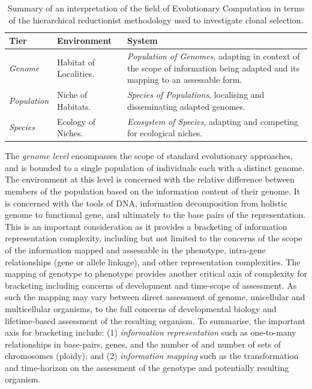 \begin{table}[htp]
	\centering\small
		\begin{tabularx}{\textwidth}{llX}
		\toprule
		\textbf{Tier} & \textbf{Environment} & \textbf{System} \\ 
		\toprule
		\emph{Genome} & Habitat of Localities. & \emph{Population of Genomes}, adapting in context of the scope of information being adapted and its mapping to an assessable form. \\ 
		\midrule
		\emph{Population} & Niche of Habitats. & \emph{Species of Populations}, localising and disseminating adapted genomes.\\ 
		\midrule
		\emph{Species} & Ecology of Niches. & \emph{Ecosystem of Species}, adapting and competing for ecological niches. \\ 
		\bottomrule
		\end{tabularx}
	\caption{Summary of an interpretation of the field of Evolutionary Computation in terms of the hierarchical reductionist methodology used to investigate clonal selection.}
	\label{tab:framework:other:ec}
\end{table}

The \emph{genome level} encompasses the scope of standard evolutionary approaches, and is bounded to a single population of individuals each with a distinct genome. The environment at this level is concerned with the relative difference between members of the population based on the information content of their genome. It is concerned with the tools of DNA, information decomposition from holistic genome to functional gene, and ultimately to the base pairs of the representation. This is an important consideration as it provides a bracketing of information representation complexity, including but not limited to the concerns of the scope of the information mapped and assessable in the phenotype, intra-gene relationships (gene or allele linkage), and other representation complexities. The mapping of genotype to phenotype provides another critical axis of complexity for bracketing including concerns of development and time-scope of assessment. As such the mapping may vary between direct assessment of genome, unicellular and multicellular organisms, to the full concerns of developmental biology and lifetime-based assessment of the resulting organism.
To summarise, the important axis for bracketing include: (1) \emph{information representation} such as one-to-many relationships in base-pairs, genes, and the number of and number of sets of chromosomes (ploidy); and (2) \emph{information mapping} such as the transformation and time-horizon on the assessment of the genotype and potentially resulting organism.

